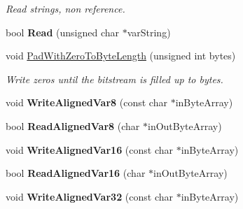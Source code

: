 \begin{DoxyCompactItemize}
\begin{DoxyCompactList}\small\item\em Read strings, non reference. \end{DoxyCompactList}\item 
\hypertarget{class_rak_net_1_1_bit_stream_ab9047dedfca48f2670a00294ac2574d9}{bool {\bfseries Read} (unsigned char $\ast$var\-String)}\label{class_rak_net_1_1_bit_stream_ab9047dedfca48f2670a00294ac2574d9}

\item 
\hypertarget{class_rak_net_1_1_bit_stream_a1517a13993e3b19f84692db75d1c162f}{void \hyperlink{class_rak_net_1_1_bit_stream_a1517a13993e3b19f84692db75d1c162f}{Pad\-With\-Zero\-To\-Byte\-Length} (unsigned int bytes)}\label{class_rak_net_1_1_bit_stream_a1517a13993e3b19f84692db75d1c162f}

\begin{DoxyCompactList}\small\item\em Write zeros until the bitstream is filled up to {\itshape bytes}. \end{DoxyCompactList}\item 
\hypertarget{class_rak_net_1_1_bit_stream_a82ed121cb677f410358953c71451d9b7}{void {\bfseries Write\-Aligned\-Var8} (const char $\ast$in\-Byte\-Array)}\label{class_rak_net_1_1_bit_stream_a82ed121cb677f410358953c71451d9b7}

\item 
\hypertarget{class_rak_net_1_1_bit_stream_a654b5105b45837a19c52354e3813742b}{bool {\bfseries Read\-Aligned\-Var8} (char $\ast$in\-Out\-Byte\-Array)}\label{class_rak_net_1_1_bit_stream_a654b5105b45837a19c52354e3813742b}

\item 
\hypertarget{class_rak_net_1_1_bit_stream_a313dab1af95f0622d8ff662599ea2cbc}{void {\bfseries Write\-Aligned\-Var16} (const char $\ast$in\-Byte\-Array)}\label{class_rak_net_1_1_bit_stream_a313dab1af95f0622d8ff662599ea2cbc}

\item 
\hypertarget{class_rak_net_1_1_bit_stream_a55ed13434e659c7e541629d2d62a7167}{bool {\bfseries Read\-Aligned\-Var16} (char $\ast$in\-Out\-Byte\-Array)}\label{class_rak_net_1_1_bit_stream_a55ed13434e659c7e541629d2d62a7167}

\item 
\hypertarget{class_rak_net_1_1_bit_stream_a6c8f20a0d443655a81322b7885b70300}{void {\bfseries Write\-Aligned\-Var32} (const char $\ast$in\-Byte\-Array)}\label{class_rak_net_1_1_bit_stream_a6c8f20a0d443655a81322b7885b70300}


\end{DoxyCompactItemize}

